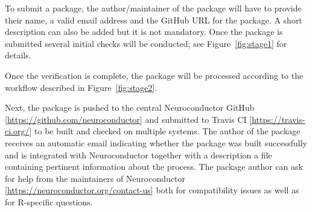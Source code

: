 \documentclass[]{elsarticle} %
\begin{document}
To submit a package, the author/maintainer of the package will have to provide their name, a valid email address and the GitHub URL for the package. A short description can also be added but it is not mandatory. Once the package is submitted several initial checks will be conducted; see Figure~\ref{fig:stage1} for details.

Once the verification is complete, the package will be processed according to the workflow described in Figure~\ref{fig:stage2}. 

Next, the package is pushed to the central Neuroconductor GitHub [\url{https://github.com/neuroconductor}] and submitted to Travis CI [\url{https://travis-ci.org/}] to be built and checked on multiple systems. The author of the package receives an automatic email indicating whether the package was built successfully and is integrated with Neuroconductor together with a description a file containing pertinent information about the process. The package author can ask for help from the maintainers of Neuroconductor [\url{https://neuroconductor.org/contact-us}] both for compatibility issues as well as for R-specific questions. 
\end{document}
